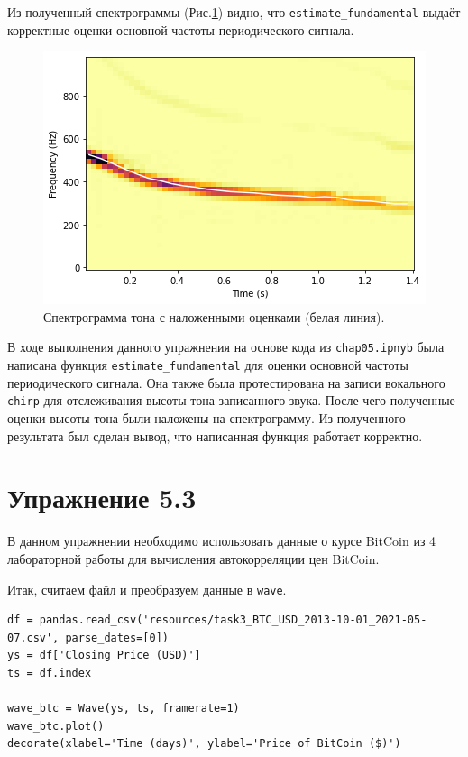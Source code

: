 \documentclass[a4paper, 14pt]{extarticle}
\begin{document}
    Из полученный спектрограммы (Рис.\ref{fig:task2_grades_spectrogram}) видно, что \texttt{estimate\_fundamental}
    выдаёт корректные оценки основной частоты периодического сигнала.

    \begin{figure}[H]
        \centering
        \includegraphics[width=0.7\linewidth]{resources/Images/task2_grades_spectrogram}
        \caption{Спектрограмма тона с наложенными оценками (белая линия).}
        \label{fig:task2_grades_spectrogram}
    \end{figure}

    В ходе выполнения данного упражнения на основе кода из \texttt{chap05.ipnyb} была написана функция \texttt{estimate\_fundamental}
    для оценки основной частоты периодического сигнала. Она также была протестирована на записи вокального \texttt{chirp}
    для отслеживания высоты тона записанного звука. После чего полученные оценки высоты тона были наложены на спектрограмму.
    Из полученного результата был сделан вывод, что написанная функция работает корректно.

    \newpage

    \section{Упражнение 5.3}
    \label{sec:task3}

    В данном упражнении необходимо использовать данные о курсе BitCoin из 4 лабораторной работы для вычисления
    автокорреляции цен BitCoin.

    Итак, считаем файл и преобразуем данные в \texttt{wave}.

    \begin{lstlisting}[caption= Чтение файла и получение \texttt{wave}., label={lst:task3_wave_btc}]
df = pandas.read_csv('resources/task3_BTC_USD_2013-10-01_2021-05-07.csv', parse_dates=[0])
ys = df['Closing Price (USD)']
ts = df.index

wave_btc = Wave(ys, ts, framerate=1)
wave_btc.plot()
decorate(xlabel='Time (days)', ylabel='Price of BitCoin ($)')   \end{lstlisting}
\end{document}
